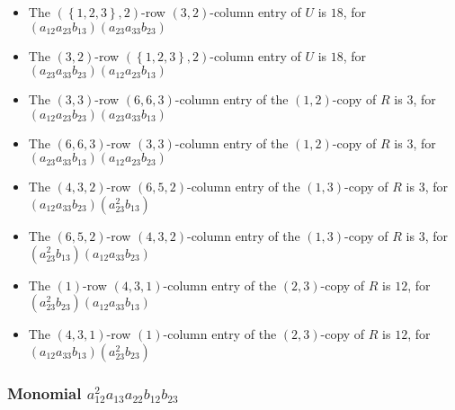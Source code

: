\documentclass{article}
\begin{document}
\begin{itemize}
\item The $ \left(\left\{1, 2, 3\right\}, 2\right) $-row $ \left(3, 2\right) $-column entry of $U$ is $ 18 $, for $( a_{12} a_{23} b_{13} )( a_{23} a_{33} b_{23} )$ 
\item The $ \left(3, 2\right) $-row $ \left(\left\{1, 2, 3\right\}, 2\right) $-column entry of $U$ is $ 18 $, for $( a_{23} a_{33} b_{23} )( a_{12} a_{23} b_{13} )$ 
\item The $(3, 3)$-row $(6, 6, 3)$-column entry of the $ \left(1, 2\right) $-copy of $R$ is $ 3 $, for $( a_{12} a_{23} b_{23} )( a_{23} a_{33} b_{13} )$ 
\item The $(6, 6, 3)$-row $(3, 3)$-column entry of the $ \left(1, 2\right) $-copy of $R$ is $ 3 $, for $( a_{23} a_{33} b_{13} )( a_{12} a_{23} b_{23} )$ 
\item The $(4, 3, 2)$-row $(6, 5, 2)$-column entry of the $ \left(1, 3\right) $-copy of $R$ is $ 3 $, for $( a_{12} a_{33} b_{23} )( a_{23}^{2} b_{13} )$ 
\item The $(6, 5, 2)$-row $(4, 3, 2)$-column entry of the $ \left(1, 3\right) $-copy of $R$ is $ 3 $, for $( a_{23}^{2} b_{13} )( a_{12} a_{33} b_{23} )$ 
\item The $(1)$-row $(4, 3, 1)$-column entry of the $ \left(2, 3\right) $-copy of $R$ is $ 12 $, for $( a_{23}^{2} b_{23} )( a_{12} a_{33} b_{13} )$ 
\item The $(4, 3, 1)$-row $(1)$-column entry of the $ \left(2, 3\right) $-copy of $R$ is $ 12 $, for $( a_{12} a_{33} b_{13} )( a_{23}^{2} b_{23} )$ 
\end{itemize}
\subsubsection{Monomial $ a_{12}^{2} a_{13} a_{22} b_{12} b_{23} $}
\end{document}
